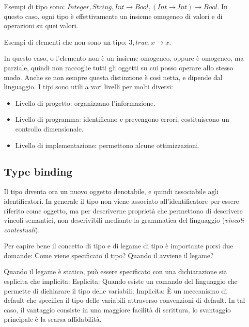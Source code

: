 \documentclass[oneside,a4paper,11pt]{book}
\theoremstyle{italicstyle}
\theoremstyle{normStyle}
\begin{document}
Esempi di tipo sono: $Integer, String, Int \rightarrow Bool, (Int \rightarrow Int) \rightarrow Bool$.
In questo caso, ogni tipo è effettivamente un insieme omogeneo di valori e di operazioni su quei valori.

Esempi di elementi che non sono un tipo: ${3, true, x \rightarrow x}$.

In questo caso, o l'elemento non è un insieme omogeneo, oppure è omogeneo, ma parziale, quindi 
non raccoglie tutti gli oggetti su cui posso operare allo stesso modo. 
Anche se non sempre questa distinzione è così netta, e dipende dal linguaggio. I 
tipi sono utili a vari livelli per molti diversi:
\begin{itemize}
  \item Livello di progetto: organizzano l'informazione.
  \item Livello di programma: identificano e prevengono errori, costituiscono 
  un controllo dimensionale.
  \item Livello di implementazione: permettono alcune ottimizzazioni.
\end{itemize}
\subsection{Type binding}
Il tipo diventa ora un nuovo oggetto denotabile, e quindi associabile
agli identificatori. In generale il tipo non viene associato
all’identificatore per essere riferito come oggetto, ma per descriverne proprietà
che permettono di descrivere vincoli semantici, non descrivibili mediante
la grammatica del linguaggio (\textit{vincoli contestuali}).

Per capire bene il concetto di tipo e di legame di tipo è importante porsi due
domande: Come viene specificato il tipo? Quando il avviene il legame?

Quando il legame è statico, può essere specificato con una dichiarazione sia
esplicita che implicita: Esplicita: Quando esiste un comando del linguaggio
che permette di dichiarare il tipo delle variabili; Implicita: È un meccanismo
di default che specifica il tipo delle variabili attraverso convenzioni di default.
In tal caso, il vantaggio consiste in una maggiore facilità di scrittura, lo svantaggio
principale è la scarsa affidabilità.
\end{document}
